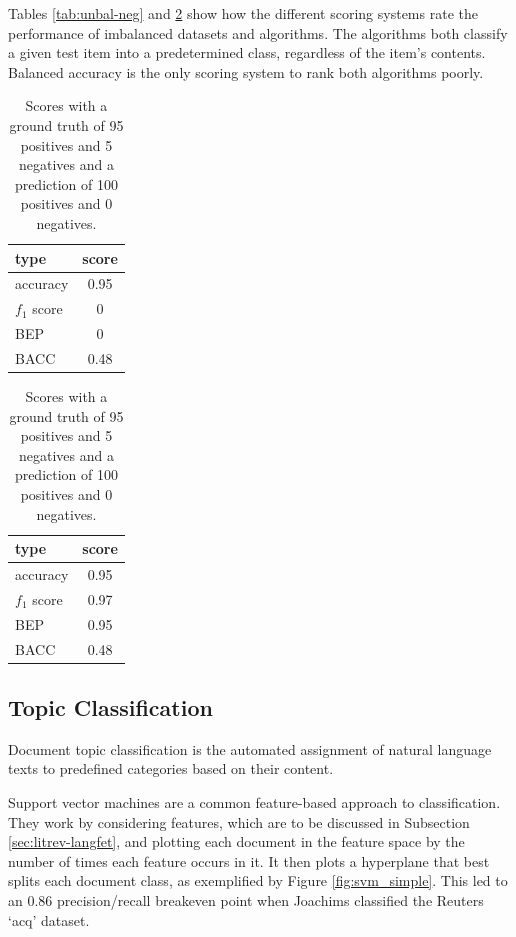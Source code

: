 			Tables \ref{tab:unbal-neg} and \ref{tab:unbal-pos} show how the different scoring systems rate the performance of imbalanced datasets and algorithms. The algorithms both classify a given test item into a predetermined class, regardless of the item's contents. Balanced accuracy is the only scoring system to rank both algorithms poorly.
			
			\begin{table}
				\parbox{.45\linewidth}{
					\centering
					\begin{tabular}{l|c}
						\hline
						type&score\\
						\hline
						accuracy&0.95\\
						$f_1$ score&0\\
						BEP&0\\
						BACC&0.48
					\end{tabular}
					\caption{Scores with a ground truth of 5 positives and 95 negatives and a prediction of 0 positives and 100 negatives.}\label{tab:unbal-neg}
				}
				\hfill
				\parbox{.45\linewidth}{
					\centering
					\begin{tabular}{l|c}
						\hline
						type&score\\
						\hline
						accuracy&0.95\\
						$f_1$ score&0.97\\
						BEP&0.95\\
						BACC&0.48
					\end{tabular}
					\caption{Scores with a ground truth of 95 positives and 5 negatives and a prediction of 100 positives and 0 negatives.}\label{tab:unbal-pos}
				}
			\end{table}
		\subsection{Topic Classification}\label{ssec:topclas}
			Document topic classification is the automated assignment of natural language texts to predefined categories based on their content\cite{ml_automated_sebastiani}.  

			Support vector machines are a common feature-based approach to classification. They work by considering features, which are to be discussed in Subsection \ref{sec:litrev-langfet}, and plotting each document in the feature space by the number of times each feature occurs in it. It then plots a hyperplane that best splits each document class, as exemplified by Figure \ref{fig:svm_simple}. This led to an 0.86 precision/recall breakeven point when Joachims classified the Reuters `acq' dataset\cite{svm_joachims}.  

